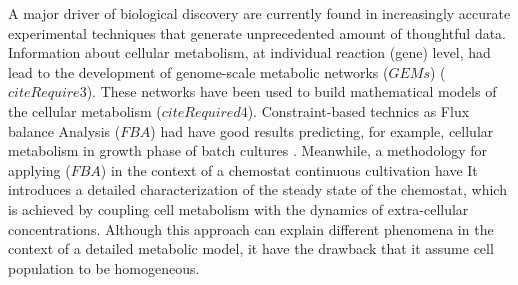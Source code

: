 \documentclass[]{article}
\begin{document}
	
	
	A major driver of biological discovery are currently found in increasingly accurate experimental 
	techniques that generate unprecedented amount of thoughtful data. 
	Information about cellular metabolism, at individual reaction (gene) level, had lead to the development 
	of genome-scale metabolic networks ($GEMs$) ($citeRequire3$). 
	These networks have been used to build mathematical models of the cellular metabolism ($citeRequired4$).
	Constraint-based technics as Flux balance Analysis ($FBA$) had have good results predicting, for example, 
	cellular metabolism in growth phase of batch cultures \cite{palssonSystemBiologyPropereties2006}. 
	Meanwhile, a methodology for applying ($FBA$) in the context of a chemostat continuous cultivation have 
	It introduces a detailed characterization of the steady state of the chemostat, which is achieved by 
	coupling cell metabolism with the dynamics of extra-cellular concentrations. 
	Although this approach can explain different phenomena in the context of a detailed metabolic model, 
	it have the drawback that it assume cell population to be homogeneous.
	
	

\end{document}
